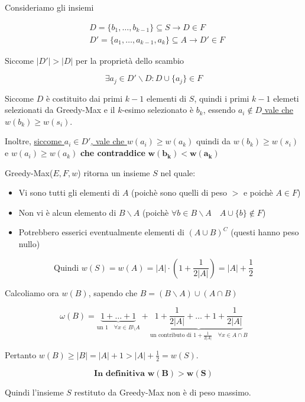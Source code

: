 Consideriamo gli insiemi
{
    \large
    
    \begin{align*}
        & D = \{b_1, \dots, b_{k-1}\} \subseteq S \to D \in F \\
        & D' = \{a_1, \dots, a_{k-1}, a_k\} \subseteq A \to D' \in F 
    \end{align*}
}

Siccome $|D'| > |D|$ per la proprietà dello scambio

{
    \large
    $$
        \exists a_j \in D' \backslash D : D \cup \{a_j\} \in F
    $$
}

Siccome $D$ è costituito dai primi $k-1$ elementi di $S$, quindi i primi $k-1$ elemeti selezionati da Greedy-Max e il $k$-esimo selezionato è $b_k$, essendo \uline{$a_i \not \in D$ vale che $w(b_k) \geq w(s_i)$}.

Inoltre, \uline{siccome $a_i \in D'$, vale che $w(a_i) \geq w(a_k)$} quindi da $w(b_k) \geq w(s_i)$ e $w(a_i) \geq w(a_k)$ \textbf{che contraddice} $\mathbf{w(b_k) < w(a_k)}$

\newpage
Greedy-Max($E,F,w$) ritorna un insieme $S$ nel quale:
\begin{itemize}
    \item Vi sono tutti gli elementi di $A$ (poichè sono quelli di peso $>$ e poichè $A \in F$)
    \item Non vi è alcun elemento di $B \backslash A$ (poichè $\forall b \in B \backslash A \quad A \cup \{b\} \not \in F$)
    \item Potrebbero esserici eventualmente elementi di $(A \cup B)^C$ (questi hanno peso nullo)
\end{itemize}

$$\text{Quindi } w(S) = w(A) = |A| \cdot (1 + \frac{1}{2|A|}) = |A| + \frac{1}{2}$$

Calcoliamo ora $w(B)$, sapendo che $B = (B \backslash A) \cup (A \cap B)$

{
    \large
    \[
    \omega(B) = \underbrace{1 + \dots + 1}_{\text{un } 1 \quad \forall x \in B \setminus A} 
    + \underbrace{1 + \frac{1}{2|A|} + \dots + 1 + \frac{1}{2|A|}}_{\text{un contributo di } 1 + \frac{1}{2|A|} \quad \forall x \in A \cap B}
    \]
}

Pertanto $w(B) \geq |B| = |A| + 1 > |A| + \frac{1}{2} = w(S)$.

{
    \large
    $$
    \mathbf{\text{In definitiva } w(B) > w(S)}
    $$
}

Quindi l'insieme $S$ restituto da Greedy-Max non è di peso massimo.
